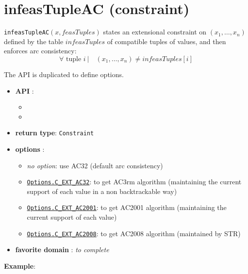 \label{infeastupleac}
\hypertarget{infeastupleac}{}

\section{infeasTupleAC (constraint)}\label{infeastupleac:infeastupleacconstraint}\hypertarget{infeastupleac:infeastupleacconstraint}{}
\begin{notedef}
  \texttt{infeasTupleAC}$(x,feasTuples)$ states an extensional constraint on $(x_1,\ldots,x_n)$ defined by the table $infeasTuples$ of compatible tuples of values, and then enforces arc consistency:
      $$\forall \text{ tuple } i\ |\quad (x_1,\ldots,x_n)\neq infeasTuples[i]$$
\end{notedef}

The API is duplicated to define options.
\begin{itemize}
	\item \textbf{API} :
	\begin{itemize}
		\item {}
		\item {}
	\end{itemize}
	\item \textbf{return type}: \texttt{Constraint}
	\item \textbf{options} :
	\begin{itemize}
		\item \emph{no option}: use AC32 (default arc consistency)
		\item \hyperlink{cext32:cext32options}{\tt Options.C\_EXT\_AC32}: to get AC3rm algorithm (maintaining the current support of each value in a non backtrackable way)
		\item \hyperlink{cext32:cext2001options}{\tt Options.C\_EXT\_AC2001}: to get AC2001 algorithm (maintaining the current support of each value)
		\item \hyperlink{cext32:cext2008options}{\tt Options.C\_EXT\_AC2008}: to get AC2008 algorithm (maintained by STR)
	\end{itemize}
	\item \textbf{favorite domain} : \emph{to complete}
\end{itemize}

\textbf{Example}:

